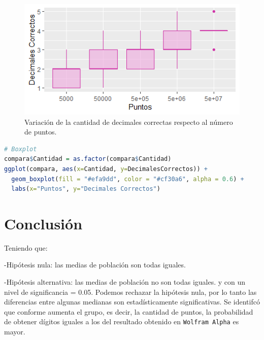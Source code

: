\documentclass{article}
\begin{document}
\begin{figure}[h!] %
    \centering
    \includegraphics[width=150mm]{boxplothw5.png} %
    \caption{Variaci\'on de la cantidad de decimales correctas respecto al n\'umero de puntos.}
    \label{Figura 1}
\end{figure}

\begin{lstlisting}[language=R, caption= C\'odigo data frame \texttt{compara}.]
# Boxplot
compara$Cantidad = as.factor(compara$Cantidad)
ggplot(compara, aes(x=Cantidad, y=DecimalesCorrectos)) +
  geom_boxplot(fill = "#efa9dd", color = "#cf30a6", alpha = 0.6) +
  labs(x="Puntos", y="Decimales Correctos") 
\end{lstlisting}




\section{Conclusi\'on}

Teniendo que:

-Hip\'otesis nula: las medias de poblaci\'on son todas iguales.

-Hip\'otesis alternativa: las medias de poblaci\'on no son todas iguales.
y con un nivel de significancia = 0.05. Podemos rechazar la hip\'otesis nula, por lo tanto las diferencias entre algunas medianas son estad\'isticamente significativas.
Se identifc\'o que conforme aumenta el grupo, es decir, la cantidad de puntos, la probabilidad de obtener dígitos iguales a los del resultado obtenido en \texttt{Wolfram Alpha} es mayor.



\end{document}

